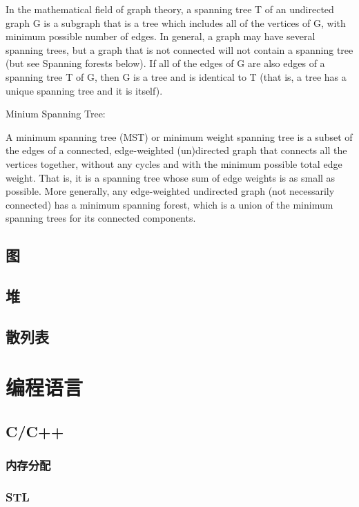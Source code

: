\documentclass[12pt]{article}  %
\begin{document}
In the mathematical field of graph theory, a spanning tree T of an undirected graph G is a subgraph that is a tree which includes all of the vertices of G, with minimum possible number of edges. In general, a graph may have several spanning trees, but a graph that is not connected will not contain a spanning tree (but see Spanning forests below). If all of the edges of G are also edges of a spanning tree T of G, then G is a tree and is identical to T (that is, a tree has a unique spanning tree and it is itself).

Minium Spanning Tree:

A minimum spanning tree (MST) or minimum weight spanning tree is a subset of the edges of a connected, edge-weighted (un)directed graph that connects all the vertices together, without any cycles and with the minimum possible total edge weight. That is, it is a spanning tree whose sum of edge weights is as small as possible. More generally, any edge-weighted undirected graph (not necessarily connected) has a minimum spanning forest, which is a union of the minimum spanning trees for its connected components.

\subsection{图}

\subsection{堆}

\subsection{散列表}

\section{编程语言}

\subsection{C/C++}

\subsubsection{内存分配}

\subsubsection{STL}
\end{document}
